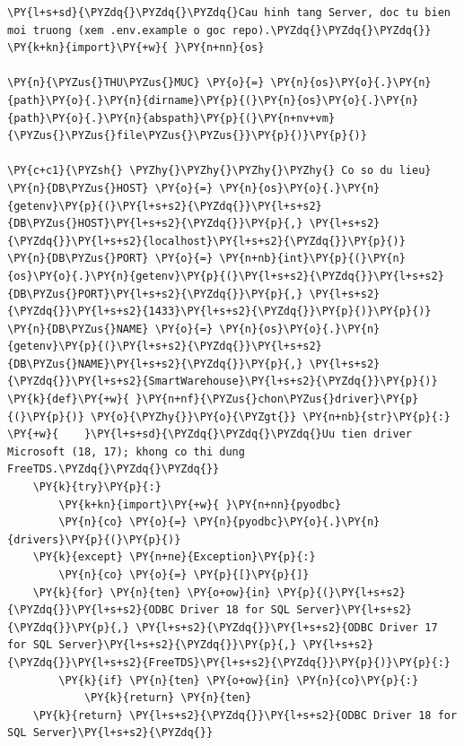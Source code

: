 \begin{Verbatim}[commandchars=\\\{\},frame=single,framerule=0.3pt,rulecolor=\color{black!40},fontsize=\footnotesize,breaklines=true]
\PY{l+s+sd}{\PYZdq{}\PYZdq{}\PYZdq{}Cau hinh tang Server, doc tu bien moi truong (xem .env.example o goc repo).\PYZdq{}\PYZdq{}\PYZdq{}}
\PY{k+kn}{import}\PY{+w}{ }\PY{n+nn}{os}

\PY{n}{\PYZus{}THU\PYZus{}MUC} \PY{o}{=} \PY{n}{os}\PY{o}{.}\PY{n}{path}\PY{o}{.}\PY{n}{dirname}\PY{p}{(}\PY{n}{os}\PY{o}{.}\PY{n}{path}\PY{o}{.}\PY{n}{abspath}\PY{p}{(}\PY{n+nv+vm}{\PYZus{}\PYZus{}file\PYZus{}\PYZus{}}\PY{p}{)}\PY{p}{)}

\PY{c+c1}{\PYZsh{} \PYZhy{}\PYZhy{}\PYZhy{}\PYZhy{} Co so du lieu}
\PY{n}{DB\PYZus{}HOST} \PY{o}{=} \PY{n}{os}\PY{o}{.}\PY{n}{getenv}\PY{p}{(}\PY{l+s+s2}{\PYZdq{}}\PY{l+s+s2}{DB\PYZus{}HOST}\PY{l+s+s2}{\PYZdq{}}\PY{p}{,} \PY{l+s+s2}{\PYZdq{}}\PY{l+s+s2}{localhost}\PY{l+s+s2}{\PYZdq{}}\PY{p}{)}
\PY{n}{DB\PYZus{}PORT} \PY{o}{=} \PY{n+nb}{int}\PY{p}{(}\PY{n}{os}\PY{o}{.}\PY{n}{getenv}\PY{p}{(}\PY{l+s+s2}{\PYZdq{}}\PY{l+s+s2}{DB\PYZus{}PORT}\PY{l+s+s2}{\PYZdq{}}\PY{p}{,} \PY{l+s+s2}{\PYZdq{}}\PY{l+s+s2}{1433}\PY{l+s+s2}{\PYZdq{}}\PY{p}{)}\PY{p}{)}
\PY{n}{DB\PYZus{}NAME} \PY{o}{=} \PY{n}{os}\PY{o}{.}\PY{n}{getenv}\PY{p}{(}\PY{l+s+s2}{\PYZdq{}}\PY{l+s+s2}{DB\PYZus{}NAME}\PY{l+s+s2}{\PYZdq{}}\PY{p}{,} \PY{l+s+s2}{\PYZdq{}}\PY{l+s+s2}{SmartWarehouse}\PY{l+s+s2}{\PYZdq{}}\PY{p}{)}
\PY{k}{def}\PY{+w}{ }\PY{n+nf}{\PYZus{}chon\PYZus{}driver}\PY{p}{(}\PY{p}{)} \PY{o}{\PYZhy{}}\PY{o}{\PYZgt{}} \PY{n+nb}{str}\PY{p}{:}
\PY{+w}{    }\PY{l+s+sd}{\PYZdq{}\PYZdq{}\PYZdq{}Uu tien driver Microsoft (18, 17); khong co thi dung FreeTDS.\PYZdq{}\PYZdq{}\PYZdq{}}
    \PY{k}{try}\PY{p}{:}
        \PY{k+kn}{import}\PY{+w}{ }\PY{n+nn}{pyodbc}
        \PY{n}{co} \PY{o}{=} \PY{n}{pyodbc}\PY{o}{.}\PY{n}{drivers}\PY{p}{(}\PY{p}{)}
    \PY{k}{except} \PY{n+ne}{Exception}\PY{p}{:}
        \PY{n}{co} \PY{o}{=} \PY{p}{[}\PY{p}{]}
    \PY{k}{for} \PY{n}{ten} \PY{o+ow}{in} \PY{p}{(}\PY{l+s+s2}{\PYZdq{}}\PY{l+s+s2}{ODBC Driver 18 for SQL Server}\PY{l+s+s2}{\PYZdq{}}\PY{p}{,} \PY{l+s+s2}{\PYZdq{}}\PY{l+s+s2}{ODBC Driver 17 for SQL Server}\PY{l+s+s2}{\PYZdq{}}\PY{p}{,} \PY{l+s+s2}{\PYZdq{}}\PY{l+s+s2}{FreeTDS}\PY{l+s+s2}{\PYZdq{}}\PY{p}{)}\PY{p}{:}
        \PY{k}{if} \PY{n}{ten} \PY{o+ow}{in} \PY{n}{co}\PY{p}{:}
            \PY{k}{return} \PY{n}{ten}
    \PY{k}{return} \PY{l+s+s2}{\PYZdq{}}\PY{l+s+s2}{ODBC Driver 18 for SQL Server}\PY{l+s+s2}{\PYZdq{}}



\end{Verbatim}
